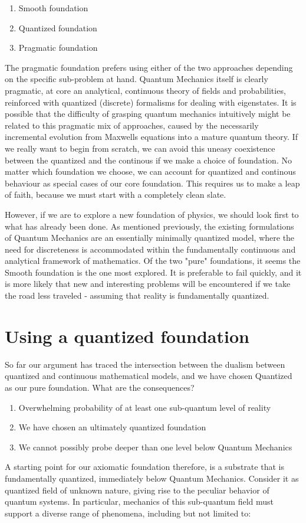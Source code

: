 \documentclass[notitlepage]{report}
\begin{document}
\begin{enumerate}
	\item Smooth foundation
	\item Quantized foundation
	\item Pragmatic foundation 

\end{enumerate}
The pragmatic foundation prefers using either of the two approaches depending on the specific sub-problem at hand. Quantum Mechanics itself is clearly pragmatic, at core an analytical, continuous theory of fields and probabilities, reinforced with quantized (discrete) formalisms for dealing with eigenstates. It is possible that the difficulty of grasping quantum mechanics intuitively might be related to this pragmatic mix of approaches, caused by the necessarily incremental evolution from Maxwells equations into a mature quantum theory. If we really want to begin from scratch, we can avoid this uneasy coexistence between the quantized and the continous if we make a  choice of foundation. No matter which foundation we choose, we can account for quantized and continous behaviour as special cases of our core foundation. This requires us to make a leap of faith, because we must start with a completely clean slate. 

However, if we are to explore a new foundation of physics, we should look first to what has already been done. As mentioned previously, the existing formulations of Quantum Mechanics are an essentially minimally quantized model, where the need for discreteness is accommodated within the fundamentally continuous and analytical framework of mathematics. Of the two "pure" foundations, it seems the Smooth foundation is the one most explored. It is preferable to fail quickly, and it is more likely that new and interesting problems will be encountered if we take the road less traveled - assuming that reality is fundamentally quantized.

\section*{Using a quantized foundation }
So far our argument has traced the intersection between the dualism between quantized and continuous mathematical models, and we have chosen Quantized as our pure foundation. What are the consequences?

\begin{enumerate}
	\item Overwhelming probability of at least one sub-quantum level of reality
	\item We have chosen an ultimately quantized foundation
	\item We cannot possibly probe deeper than one level below Quantum Mechanics

\end{enumerate}
A starting point for our axiomatic foundation therefore, is a substrate that is fundamentally quantized, immediately below Quantum Mechanics. Consider it as quantized field of unknown nature, giving rise to the peculiar behavior of quantum systems. In particular, mechanics of this sub-quantum field must support a diverse range of phenomena, including but not limited to:
\end{document}
